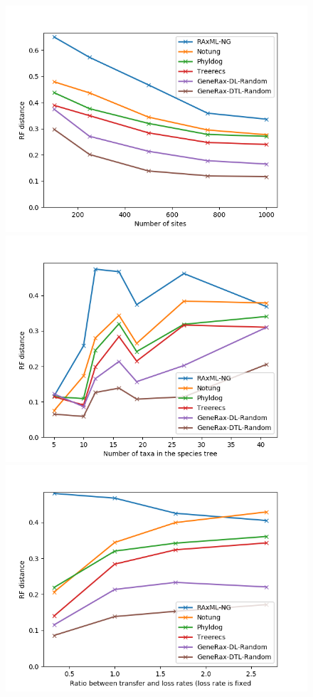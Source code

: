 \documentclass[12pt,a4paper]{article}
\begin{document}
\begin{figure}
\includegraphics[scale=0.5]{sites_dtl.png}
\includegraphics[scale=0.5]{species_dtl.png}
\includegraphics[scale=0.5]{transfers_dtl.png}

\end{figure}
\end{document}
